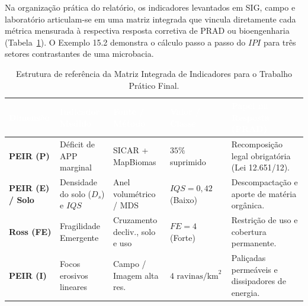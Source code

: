 Na organização prática do relatório, os indicadores levantados em SIG, campo e laboratório articulam-se em uma matriz integrada que vincula diretamente cada métrica mensurada à respectiva resposta corretiva de PRAD ou bioengenharia (Tabela~\ref{tab:matriz_integrada_ipi}). O Exemplo 15.2 demonstra o cálculo passo a passo do $IPI$ para três setores contrastantes de uma microbacia.

\begin{table}[H]
\centering
\caption{Estrutura de referência da Matriz Integrada de Indicadores para o Trabalho Prático Final.}
\label{tab:matriz_integrada_ipi}
\renewcommand{\arraystretch}{1.18}
\small
\begin{tabularx}{\textwidth}{@{}p{2.0cm} p{2.8cm} p{2.8cm} p{2.6cm} >{\raggedright\arraybackslash}X@{}}
  \toprule
  \rowcolor{uefsNavy}
  \textcolor{white}{\bfseries Dimensão} & \textcolor{white}{\bfseries Indicador Medido} & \textcolor{white}{\bfseries Fonte / Método} & \textcolor{white}{\bfseries Valor / Classe} & \textcolor{white}{\bfseries Papel na Resposta (PRAD)} \\
  \midrule
  \textbf{PEIR (P)} & Déficit de APP marginal & SICAR + MapBiomas & $35\%$ suprimido & Recomposição legal obrigatória (Lei 12.651/12). \\
  \rowcolor{bgGray}
  \textbf{PEIR (E) / Solo} & Densidade do solo ($D_s$) e $IQS$ & Anel volumétrico / MDS & $IQS = 0{,}42$ (Baixo) & Descompactação e aporte de matéria orgânica. \\
  \textbf{Ross (FE)} & Fragilidade Emergente & Cruzamento decliv., solo e uso & $FE = 4$ (Forte) & Restrição de uso e cobertura permanente. \\
  \rowcolor{bgGray}
  \textbf{PEIR (I)} & Focos erosivos lineares & Campo / Imagem alta res. & $4\text{ ravinas/km}^2$ & Paliçadas permeáveis e dissipadores de energia. \\
  \bottomrule
\end{tabularx}
\end{table}


